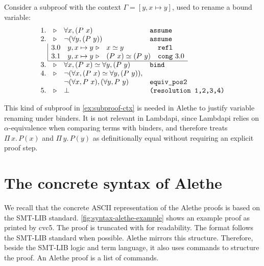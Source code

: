 \begin{example}\label{ex:subproof-ctx}
Consider a subproof with the context $\Gamma = [y, x \mapsto y]$, used to rename a bound variable:
\[
\begin{array}{r c l l}
1. & \triangleright & \forall x, (P~x) & \kw{assume} \\
2. & \triangleright & \neg (\forall y, (P~y)) & \kw{assume} \\
\multicolumn{4}{l}{%
\begin{array}{r |r c l l}
& 3.0 & y, x \mapsto y~\triangleright & x \simeq y & \kw{refl} \\
& 3.1 & y, x \mapsto y~\triangleright & (P~x) \simeq (P~y) & \kw{cong}~3.0 \\
\cline{2-5}
\end{array}
} \\
3. & \triangleright & \forall x, (P~x) \simeq \forall y, (P~y) & \kw{bind} \\
4. & \triangleright & \neg(\forall x, (P~x) \simeq \forall y, (P~y)), & \\
  &  & \neg  (\forall x, P~x),  (\forall y, P~y) & \kw{equiv\_pos2} \\

5. & \triangleright & \bot & \kw{(resolution~1,2,3,4)}
\end{array}
\]
\end{example}

\begin{remark}
This kind of subproof in \cref{ex:subproof-ctx} is needed in Alethe to justify variable renaming under binders.
It is not relevant in Lambdapi, since Lambdapi relies on $\alpha$-equivalence when comparing terms with binders,
and therefore treats $\Pi\,x.\,P(x)$ and $\Pi\,y.\,P(y)$ as definitionally equal without requiring an explicit proof step.
\end{remark}

\section{The concrete syntax of Alethe}

We recall that the concrete ASCII representation of the Alethe proofs is based on the SMT-LIB standard.
\cref{fig:syntax-alethe-example} shows an example proof as printed by cvc5. The proof is truncated with for readability.
The format follows the SMT-LIB standard when possible.
Alethe mirrors this structure. Therefore, beside the SMT-LIB logic and term language, it also uses commands to structure the proof.
An Alethe proof is a list of commands.

